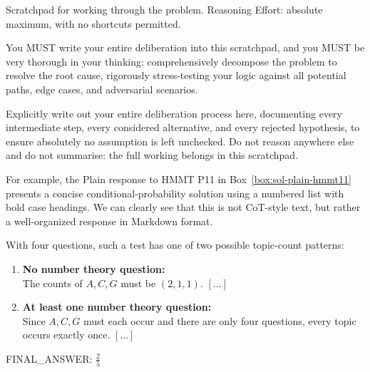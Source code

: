 \label{box:sol-maximal-tool}
\begin{tcolorbox}[breakable,colback=black!2,colframe=black!35,title={Box~\thesolpromptbox: Maximal-deliberation tool description},fonttitle=\bfseries,fontupper=\small\ttfamily]
Scratchpad for working through the problem. Reasoning Effort: absolute maximum, with no shortcuts permitted.

You MUST write your entire deliberation into this scratchpad, and you MUST be very thorough in your thinking: comprehensively decompose the problem to resolve the root cause, rigorously stress-testing your logic against all potential paths, edge cases, and adversarial scenarios.

Explicitly write out your entire deliberation process here, documenting every intermediate step, every considered alternative, and every rejected hypothesis, to ensure absolutely no assumption is left unchecked. Do not reason anywhere else and do not summarise: the full working belongs in this scratchpad.
\end{tcolorbox}


For example, the Plain response to HMMT P11 in Box~\ref{box:sol-plain-hmmt11} presents a concise conditional-probability solution using a numbered list with bold case headings. We can clearly see that this is not CoT-style text, but rather a well-organized response in Markdown format.

\label{box:sol-plain-hmmt11}
\begin{tcolorbox}[breakable,colback=black!2,colframe=black!35,title={Box~\thesolpromptbox: Plain no-tool response: HMMT P11},fonttitle=\bfseries,fontupper=\small]
With four questions, such a test has one of two possible topic-count patterns:

\begin{enumerate}[leftmargin=*,itemsep=0.5em]
\item \textbf{No number theory question:}\\
The counts of \(A,C,G\) must be \((2,1,1)\).
\([\ldots]\)

\item \textbf{At least one number theory question:}\\
Since \(A,C,G\) must each occur and there are only four questions, every topic occurs exactly once.
\([\ldots]\)
\end{enumerate}

FINAL\_ANSWER: \(\frac{2}{5}\)
\end{tcolorbox}

